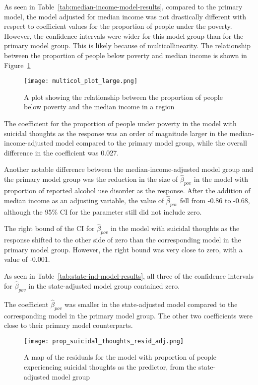 \documentclass{article}
\begin{document}
As seen in Table~\ref{tab:median-income-model-results},
compared to the primary model, the model adjusted for median income
was not drastically different with respect to 
coefficient values for
the proportion of people under the poverty.
However, the confidence intervals were wider
for this model group than for the primary model group.
This is likely because of multicollinearity.
The relationship between the proportion of people
below poverty and median income is shown in
Figure~\ref{fig:multicol}

\begin{figure}[!htb]
    \centering
    \texttt{[image: multicol\_plot\_large.png]}
    \caption{\label{fig:multicol}A plot showing the relationship
        between the proportion of people below poverty
        and the median income in a region
    }
\end{figure}

The coefficient for the proportion of people under
poverty in the model with suicidal thoughts as the response
was an order of magnitude larger in the median-income-adjusted model
compared to the primary model group,
while the overall difference in the coefficient was 0.027.

Another notable difference between
the median-income-adjusted model group and the
primary model group was the reduction in the
size of $\hat{\beta}_{pov}$ in the model with
proportion of reported alcohol use disorder as the response.
After the addition of median income as an adjusting variable,
the value of $\hat{\beta}_{pov}$ fell from -0.86 to -0.68,
although the 95\% CI for the parameter still did not include zero.

The right bound of the CI for $\hat{\beta}_{pov}$ in the
model with suicidal thoughts as the response
shifted to the other side of zero than the corresponding model
in the primary model group.
However, the right bound was very close to zero,
with a value of -0.001.

As seen in Table~\ref{tab:state-ind-model-results},
all three of the confidence intervals for
$\hat{\beta}_{pov}$ in the state-adjusted model group contained zero.

The coefficient $\hat{\beta}_{pov}$ was smaller
in the state-adjusted model compared to the
corresponding model in the
primary model group.
The other two coefficients were close to their
primary model counterparts.

\begin{figure}[!htb]
    \centering
    \texttt{[image: prop\_suicidal\_thoughts\_resid\_adj.png]}
    \caption{\label{fig:map-resid-adj-suicidal-thoughts}A map of the residuals
    for the model with
    proportion of people experiencing
    suicidal thoughts as the predictor,
    from the state-adjusted model group
    }
\end{figure}
\end{document}
